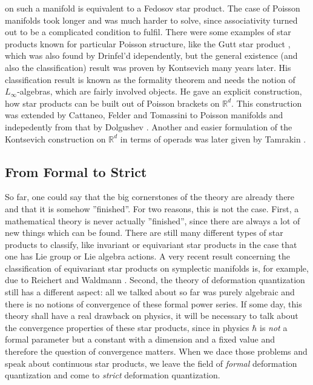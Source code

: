 on such a manifold is equivalent to a Fedosov star product. The case of Poisson 
manifolds took longer and was much harder to solve, since associativity turned 
out to be a complicated condition to fulfil. There were some examples of star 
products known for particular Poisson structure, like the Gutt star product 
\cite{gutt:1983a}, which was also found by Drinfel'd \cite{drinfeld:1983a} 
idependently, but the general existence (and also the classification) result was 
proven by Kontsevich \cite{kontsevich:1997:pre, kontsevich:2003a} many years 
later. His classification result is known as the formality theorem and needs the 
notion of $L_{\infty}$-algebras, which are fairly involved objects. He gave an 
explicit construction, how star products can be built out of Poisson brackets on 
$\mathbb{R}^d$. This construction was extended by Cattaneo, Felder and Tomassini 
to Poisson manifolds \cite{cattaneo.felder.tomassini:2002b} and indepedently from 
that by Dolgushev \cite{dolgushev:2005a}. Another and easier formulation of the 
Kontsevich construction on $\mathbb{R}^d$ in terms of operads was later given by 
Tamrakin \cite{tamarkin:2003a}.



\subsection{From Formal to Strict}
\label{subsec:chap2_Formal2Strict}

So far, one could say that the big cornerstones of the theory are already there 
and that it is somehow ''finished''. For two reasons, this is not the case. 
First, a mathematical theory is never actually ''finished'', since there are 
always a lot of new things which can be found. There are still many different 
types of star products to classify, like invariant or equivariant star products 
in the case that one has Lie group or Lie algebra actions. A very recent result 
concerning the classification of equivariant star products on symplectic 
manifolds is, for example, due to Reichert and Waldmann 
\cite{reichert.waldmann:2015a:pre}. Second, the theory of deformation 
quantization still has a different aspect: all we talked about so far was purely 
algebraic and there is no notions of convergence of these formal power series. 
If some day, this theory shall have a real drawback on physics, it will be 
necessary to talk about the convergence properties of these star products, since 
in physics $\hbar$ is \emph{not} a formal parameter but a constant with a 
dimension and a fixed value and therefore the question of convergence matters. 
When we dace those problems and speak about continuous star products, we leave the 
field of \emph{formal} deformation quantization and come to \emph{strict} 
deformation quantization.


